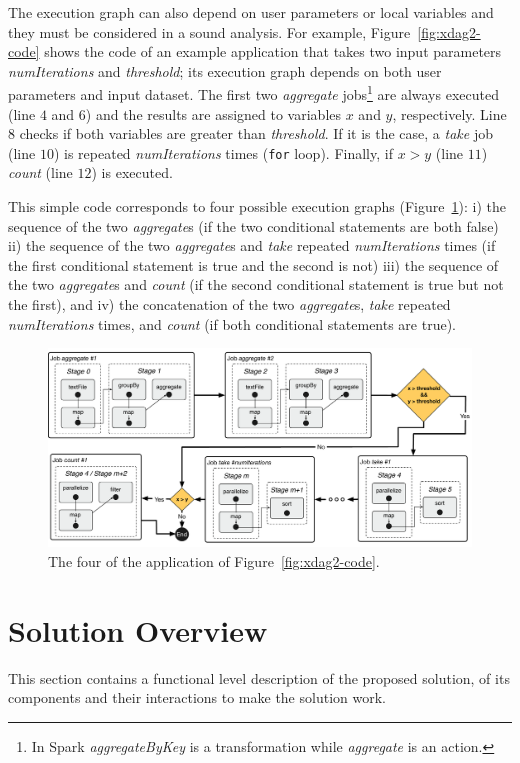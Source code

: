The execution graph can also depend on user parameters or local variables and they must be considered in a sound analysis. For example, Figure~\ref{fig:xdag2-code} shows the code of an example application that takes two input parameters \textit{numIterations} and \textit{threshold}; its execution graph depends on both user parameters and input dataset. The first two \textit{aggregate} jobs\footnote{In Spark \textit{aggregateByKey} is a transformation while \textit{aggregate} is an action.} are always executed (line $4$ and $6$) and the results are assigned to variables $x$ and $y$, respectively. Line $8$ checks if both variables are greater than \textit{threshold}. If it is the case, a \textit{take} job (line $10$) is repeated \textit{numIterations} times (\verb#for# loop). Finally, if $x > y$ (line $11$) \textit{count} (line $12$) is executed. 

This simple code corresponds to four possible execution graphs (Figure~\ref{fig:xdag2}): i) the sequence of the two \textit{aggregate}s  (if the two conditional statements are both false) ii) the sequence of the two \textit{aggregate}s and \textit{take} repeated \textit{numIterations} times (if the first conditional statement is true and the second is not) iii) the sequence of the two \textit{aggregate}s and \textit{count} (if the second conditional statement is true but not the first), and iv) the concatenation of the two \textit{aggregate}s, \textit{take} repeated \textit{numIterations} times, and \textit{count} (if both conditional statements are true).

\begin{figure}[t]
	\centering
	\includegraphics[width=\columnwidth]{images/xdag2.pdf}
	\caption{The four  \plans of the application of Figure~\ref{fig:xdag2-code}.}
	\label{fig:xdag2}
\end{figure}

\section{Solution Overview}\label{sec:solution_overview}
This section contains a functional level description of the proposed solution, of its components and their interactions to make the solution work.

